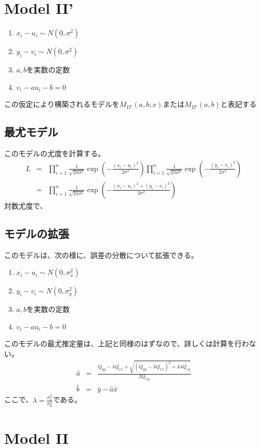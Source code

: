 \section{Model II'}

\begin{enumerate}
 \item $x_i-u_i \sim N(0,\sigma^2)$
 \item $y_i-v_i \sim N(0,\sigma^2)$
 \item $a,b$を実数の定数
 \item $v_i -a u_i -b = 0$
\end{enumerate}
この仮定により構築されるモデルを$M_{II'}(a,b; x)$または$M_{II'}(a,b)$と表記する

\subsection{最尤モデル}
このモデルの尤度を計算する。
\begin{eqnarray*}
 L &=& \prod_{i=1}^{n}\frac{1}{\sqrt{2\pi\sigma^2}}\exp\left(-\frac{(x_i-u_i)^2}{2\sigma^2} \right)\prod_{i=1}^{n}\frac{1}{\sqrt{2\pi\sigma^2}}\exp\left(-\frac{(y_i-v_i)^2}{2\sigma^2} \right)\\
 &=& \prod_{i=1}^{n}\frac{1}{\sqrt{2\pi\sigma^2}}\exp\left(-\frac{(x_i-u_i)^2+(y_i-v_i)^2}{2\sigma^2} \right)
\end{eqnarray*}
対数尤度で、

\subsection{モデルの拡張}
このモデルは、次の様に、誤差の分散について拡張できる。
\begin{enumerate}
 \item $x_i-u_i \sim N(0,\sigma_x^2)$
 \item $y_i-v_i \sim N(0,\sigma_y^2)$
 \item $a,b$を実数の定数
 \item $v_i -a u_i -b = 0$
\end{enumerate}
このモデルの最尤推定量は、上記と同様のはずなので、詳しくは計算を行わない。
\begin{eqnarray*}
 \hat{a} &=& \frac{Q_{yy}-\lambda Q_{xx}+\sqrt{(Q_{yy}-\lambda Q_{xx})^2+4\lambda Q_{xy}}}{2Q_{xy}} \\
 \hat{b} &=& \bar{y}-\hat{a}\bar{x}
\end{eqnarray*}
ここで、$\lambda = \frac{\sigma_x^2}{\sigma_y^2}$である。

\section{Model II}

